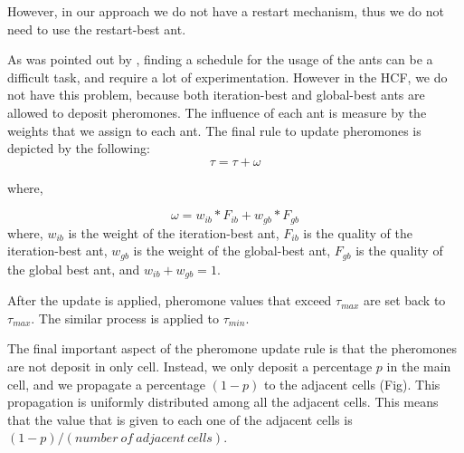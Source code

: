 			However, in our approach we do not have a restart mechanism, thus we do not need to use the restart-best ant. 

			As was pointed out by \cite{blum04}, finding a schedule for the usage of the ants can be a difficult task, and require a lot of experimentation. However in the HCF, we do not have this problem, because both iteration-best and global-best ants are allowed to deposit pheromones. The influence of each ant is measure by the weights that we assign to each ant. The final rule to update pheromones is depicted by the following:
			\begin{equation}
				\tau = \tau + \omega
			\end{equation}
			
			where,
			
			\begin{equation}
				\omega = w_{ib} * F_{ib} + w_{gb} * F_{gb}
			\end{equation}
			where, $w_{ib}$ is the weight of the iteration-best ant, $F_{ib}$ is the quality of the iteration-best ant, $w_{gb}$ is the weight of the global-best ant, $F_{gb}$ is the quality of the global best ant, and $w_{ib} + w_{gb} = 1$.
			
			After the update is applied, pheromone values that exceed $\tau_{max}$ are set back to $\tau_{max}$. The similar process is applied to $\tau_{min}$.

			The final important aspect of the pheromone update rule is that the pheromones are not deposit in only cell. Instead, we only deposit a percentage $p$ in the main cell, and we propagate a percentage $(1-p)$ to the adjacent cells (Fig). This propagation is uniformly distributed among all the adjacent cells. This means that the value that is given to each one of the adjacent cells is $(1-p) / (number\ of\ adjacent\ cells)$.
			
			
			
			
			
			